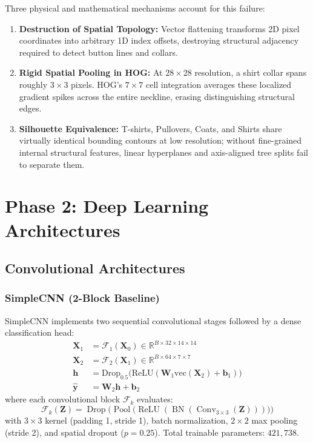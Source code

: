 \documentclass[conference]{IEEEtran}
\newcommand{\R}{\mathbb{R}}
\begin{document}
Three physical and mathematical mechanisms account for this failure:
\begin{enumerate}
    \item \textbf{Destruction of Spatial Topology:} Vector flattening transforms 2D pixel coordinates into arbitrary 1D index offsets, destroying structural adjacency required to detect button lines and collars.
    \item \textbf{Rigid Spatial Pooling in HOG:} At $28\times28$ resolution, a shirt collar spans roughly $3\times3$ pixels. HOG's $7\times7$ cell integration averages these localized gradient spikes across the entire neckline, erasing distinguishing structural edges.
    \item \textbf{Silhouette Equivalence:} T-shirts, Pullovers, Coats, and Shirts share virtually identical bounding contours at low resolution; without fine-grained internal structural features, linear hyperplanes and axis-aligned tree splits fail to separate them.
\end{enumerate}

\section{Phase 2: Deep Learning Architectures}\label{sec:phase2}

\subsection{Convolutional Architectures}

\subsubsection{SimpleCNN (2-Block Baseline)}
SimpleCNN implements two sequential convolutional stages followed by a dense classification head:
\begin{align}
\mathbf{X}_1 &= \mathcal{F}_1(\mathbf{X}_0) \in \R^{B \times 32 \times 14 \times 14} \label{eq:simple_b1} \\
\mathbf{X}_2 &= \mathcal{F}_2(\mathbf{X}_1) \in \R^{B \times 64 \times 7 \times 7} \label{eq:simple_b2} \\
\mathbf{h}   &= \text{Drop}_{0.5}\big(\text{ReLU}(\mathbf{W}_1 \text{vec}(\mathbf{X}_2) + \mathbf{b}_1)\big) \label{eq:simple_fc1} \\
\hat{\mathbf{y}} &= \mathbf{W}_2 \mathbf{h} + \mathbf{b}_2 \label{eq:simple_out}
\end{align}
where each convolutional block $\mathcal{F}_k$ evaluates:
\begin{equation}
\mathcal{F}_k(\mathbf{Z}) = \operatorname{Drop}\Big(\operatorname{Pool}\big(\operatorname{ReLU}(\operatorname{BN}(\operatorname{Conv}_{3\times3}(\mathbf{Z})))\big)\Big)
\end{equation}
with $3\times3$ kernel (padding 1, stride 1), batch normalization, $2\times2$ max pooling (stride 2), and spatial dropout ($p=0.25$). Total trainable parameters: $421{,}738$.
\end{document}
